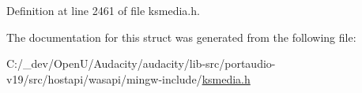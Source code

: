 Definition at line 2461 of file ksmedia.\+h.



The documentation for this struct was generated from the following file\+:\begin{DoxyCompactItemize}
\item 
C\+:/\+\_\+dev/\+Open\+U/\+Audacity/audacity/lib-\/src/portaudio-\/v19/src/hostapi/wasapi/mingw-\/include/\hyperlink{ksmedia_8h}{ksmedia.\+h}\end{DoxyCompactItemize}
